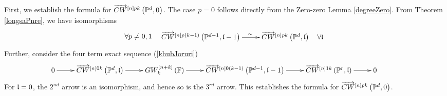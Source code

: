 \documentclass[12pt]{article}
\begin{document}
\eT
\pf First, we establish the formula for $\overrightarrow{CW}^{\left[ n\right]pk}\left( {\mathbb{P}}^d, 0\right)$.
The case $p=0$  follows directly from the Zero-zero Lemma \ref{degreeZero}.
From Theorem \ref{longsaPnre}, we have isomorphisms
$$
 \forall p\neq 0, 1\quad %
   \diagram
  \ora{CW}^{\LRt{n}p(k-1)}\LRf{{\BP}^{d-1},\l-1} \ar[r]^{\quad\sim} &
 \ora{CW}^{\LRt{n}pk}\LRf{{\BP}^d, \l} \quad \forall \l\\
 \enddiagram
 $$
Further, consider the four term exact sequence (\ref{khubJoruri})
 {
 $$ 
  \diagram
  0 \ar[r] &
 \ora{CW}^{\LRt{n}0k}\LRf{{\BP}^d, \l} \ar[r] &  GW^{\LRt{n+k}}_k\LRf{{\BF}} \ar[r] 
  &\ora{CW}^{\LRt{n}0(k-1)}\LRf{{\BP}^{d-1}, \l-1} \ar[r] &
 \ora{CW}^{\LRt{n}1k}\LRf{{\BP}^r, \l} \ar[r] & 0 &\\
 \enddiagram
$$ 
 }
For $\mathfrak {l}=0$,   the $2^{nd}$ arrow is an isomorphism, and hence so is the $3^{rd}$ arrow. This establishes the formula for  $\overrightarrow{CW}^{\left[ n\right]pk}\left( {\mathbb{P}}^d, 0\right)$.
\end{document}
